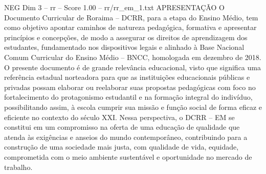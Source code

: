 \begin{textsample}{NEG Dim 3 – rr – Score 1.00 – rr/rr\_em\_1.txt}  \label{ex:f3_neg_068}
APRESENTAÇÃO O Documento Curricular de Roraima – DCRR, para a etapa do Ensino Médio, tem como objetivo apontar caminhos de natureza pedagógica, formativa e apresentar princípios e concepções, de modo a assegurar os direitos de aprendizagem dos estudantes, fundamentado nos dispositivos legais e alinhado à Base Nacional Comum Curricular do Ensino Médio – BNCC, homologada em dezembro de 2018.
O presente documento é de grande relevância educacional, visto que significa uma referência estadual norteadora para que as instituições educacionais públicas e privadas possam elaborar ou reelaborar suas propostas pedagógicas com foco no fortalecimento do protagonismo estudantil e na formação integral do indivíduo, possibilitando assim, à escola cumprir sua missão e função social de forma eficaz e eficiente no contexto do século XXI.
Nessa perspectiva, o DCRR – EM se constitui em um compromisso na oferta de uma educação de qualidade que atenda às exigências e anseios do mundo contemporâneo, contribuindo para a construção de uma sociedade mais justa, com qualidade de vida, equidade, comprometida com o meio ambiente sustentável e oportunidade no mercado de trabalho.

\end{textsample}
